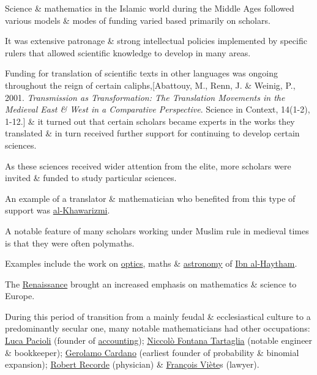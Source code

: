 \documentclass{article}
\begin{document}
%
Science \& mathematics in the Islamic world during the Middle Ages followed various models \& modes of funding varied based primarily on scholars.

It was extensive patronage \& strong intellectual policies implemented by specific rulers that allowed scientific knowledge to develop in many areas.

Funding for translation of scientific texts in other languages was ongoing throughout the reign of certain caliphs,[Abattouy, M., Renn, J. \& Weinig, P., 2001. \textit{Transmission as Transformation: The Translation Movements in the Medieval East \& West in a Comparative Perspective}. Science in Context, 14(1-2), 1-12.] \& it turned out that certain scholars became experts in the works they translated \& in turn received further support for continuing to develop certain sciences.

As these sciences received wider attention from the elite, more scholars were invited \& funded to study particular sciences.

An example of a translator \& mathematician who benefited from this type of support was \href{https://en.wikipedia.org/wiki/Al-Khawarizmi}{al-Khawarizmi}.

A notable feature of many scholars working under Muslim rule in medieval times is that they were often polymaths.

Examples include the work on \href{https://en.wikipedia.org/wiki/Optics}{optics}, maths \& \href{https://en.wikipedia.org/wiki/Astronomy}{astronomy} of \href{https://en.wikipedia.org/wiki/Ibn_al-Haytham}{Ibn al-Haytham}.

%
The \href{https://en.wikipedia.org/wiki/Renaissance}{Renaissance} brought an increased emphasis on mathematics \& science to Europe.

During this period of transition from a mainly feudal \& ecclesiastical culture to a predominantly secular one, many notable mathematicians had other occupations: \href{https://en.wikipedia.org/wiki/Luca_Pacioli}{Luca Pacioli} (founder of \href{https://en.wikipedia.org/wiki/Accounting}{accounting}); \href{https://en.wikipedia.org/wiki/Niccol%C3%B2_Fontana_Tartaglia}{Niccolò Fontana Tartaglia} (notable engineer \& bookkeeper); \href{https://en.wikipedia.org/wiki/Gerolamo_Cardano}{Gerolamo Cardano} (earliest founder of probability \& binomial expansion); \href{https://en.wikipedia.org/wiki/Robert_Recorde}{Robert Recorde} (physician) \& \href{https://en.wikipedia.org/wiki/Fran%C3%A7ois_Vi%C3%A8te}{François Viète}s (lawyer). 
\end{document}
